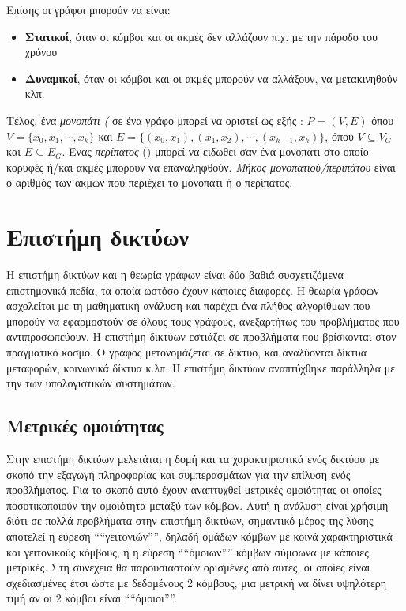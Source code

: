 Επίσης οι γράφοι μπορούν να είναι:
\begin{itemize}
    \item \textbf{Στατικοί}, όταν οι κόμβοι και οι ακμές δεν αλλάζουν 
    π.χ. με την πάροδο του χρόνου 
    \item \textbf{Δυναμικοί}, όταν οι κόμβοι και οι ακμές μπορούν να αλλάξουν, 
    να μετακινηθούν κλπ.
\end{itemize}

Τέλος, ένα \emph{μονοπάτι (} σε ένα γράφο μπορεί να οριστεί ως εξής
\cite{Diestel}: \(P = (V,E)\) όπου \(V =\{x_0,x_1,\cdots,x_k\}\) και
\(E = \{(x_0,x_1),(x_1,x_2),\cdots,(x_{k-1},x_k)\}\), όπου \(V \subseteq V_G\) και \(E 
\subseteq E_G\). Ένας \emph{περίπατος} () μπορεί να ειδωθεί σαν ένα μονοπάτι  στο οποίο κορυφές ή/και ακμές μπορουν να επαναληφθούν. \emph{Μήκος μονοπατιού/περιπάτου} είναι ο αριθμός των ακμών που περιέχει το μονοπάτι ή ο περίπατος. 

\section{Επιστήμη δικτύων}

Η επιστήμη δικτύων και η θεωρία γράφων είναι δύο βαθιά συσχετιζόμενα επιστημονικά πεδία,
τα οποία ωστόσο έχουν κάποιες διαφορές. Η θεωρία γράφων ασχολείται με τη μαθηματική ανάλυση και παρέχει ένα πλήθος αλγορίθμων
που μπορούν να εφαρμοστούν σε όλους τους γράφους, ανεξαρτήτως του προβλήματος που 
αντιπροσωπεύουν. Η επιστήμη δικτύων εστιάζει σε προβλήματα που βρίσκονται στον πραγματικό
κόσμο. Ο γράφος μετονομάζεται σε δίκτυο, και αναλύονται δίκτυα μεταφορών, κοινωνικά δίκτυα
κ.λπ. Η επιστήμη δικτύων  αναπτύχθηκε παράλληλα  με την των υπολογιστικών συστημάτων.

\subsection{Μετρικές ομοιότητας}

Στην επιστήμη δικτύων μελετάται η δομή και τα χαρακτηριστικά ενός δικτύου με σκοπό την 
εξαγωγή πληροφορίας και συμπερασμάτων για την επίλυση ενός προβλήματος. Για το σκοπό αυτό
έχουν αναπτυχθεί μετρικές ομοιότητας οι οποίες ποσοτικοποιούν την ομοιότητα μεταξύ των 
κόμβων. Αυτή η ανάλυση είναι χρήσιμη διότι σε πολλά προβλήματα στην επιστήμη δικτύων,
σημαντικό μέρος της λύσης αποτελεί η εύρεση ````γειτονιών'''', δηλαδή ομάδων κόμβων με κοινά
χαρακτηριστικά και γειτονικούς κόμβους, ή η εύρεση ````όμοιων'''' κόμβων σύμφωνα με κάποιες μετρικές.
Στη συνέχεια θα παρουσιαστούν ορισμένες από αυτές, οι οποίες είναι σχεδιασμένες έτσι ώστε
με δεδομένους 2 κόμβους, μια μετρική να δίνει υψηλότερη τιμή αν οι 2 κόμβοι είναι ````όμοιοι''''.

